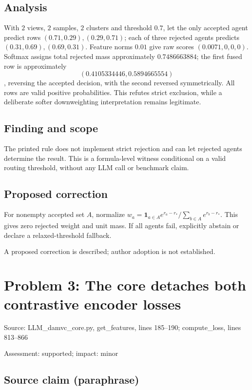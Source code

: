 \documentclass[11pt]{article}
\begin{document}
\subsection*{Analysis}

With \(2\) views, \(2\) samples, \(2\) clusters and threshold \(0.7\), let the only accepted agent predict rows \((0.71,0.29),(0.29,0.71)\); each of three rejected agents predicts \((0.31,0.69),(0.69,0.31)\). Feature norms \(0.01\) give raw scores \((0.0071,0,0,0)\). Softmax assigns total rejected mass approximately \(0.7486663884\); the first fused row is approximately \[(0.4105334446,0.5894665554)\], reversing the accepted decision, with the second reversed symmetrically. All rows are valid positive probabilities. This refutes strict exclusion, while a deliberate softer downweighting interpretation remains legitimate.

\subsection*{Finding and scope}

The printed rule does not implement strict rejection and can let rejected agents determine the result. This is a formula-level witness conditional on a valid routing threshold, without any LLM call or benchmark claim.

\subsection*{Proposed correction}

For nonempty accepted set \(A\), normalize \(w_a=\mathbf1_{a\in A}e^{r_a-r_*}/\sum_{b\in A}e^{r_b-r_*}\). This gives zero rejected weight and unit mass. If all agents fail, explicitly abstain or declare a relaxed-threshold fallback.

A proposed correction is described; author adoption is not established.

\section*{Problem 3: The core detaches both contrastive encoder losses}

Source: LLM\_damvc\_core.py, get\_features, lines 185–190; compute\_loss, lines 813–866

Assessment: supported; impact: minor

\subsection*{Source claim (paraphrase)}
\end{document}
